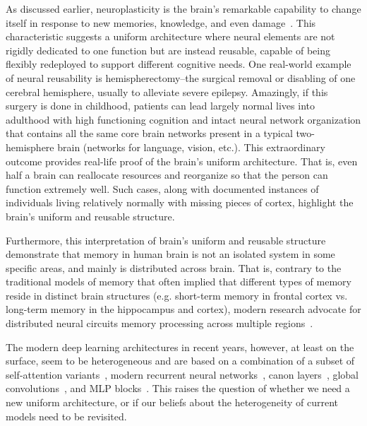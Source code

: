 \documentclass{article}
\newcommand{\citep}{\parencite}
\newcommand{\head}[1]{\vspace{1.7mm}\noindent{{\textcolor{c4}{\bf #1.}}}}
\begin{document}
\head{Brain's Uniform and Reusable Structure} As discussed earlier, neuroplasticity is the brain's remarkable capability to change itself in response to new memories, knowledge, and even damage~\citep{pascual2005plastic, johnston2009plasticity}. This characteristic suggests a uniform architecture where neural elements are not rigidly dedicated to one function but are instead reusable, capable of being flexibly redeployed to support different cognitive needs. One real-world example of neural reusability is hemispherectomy–the surgical removal or disabling of one cerebral hemisphere, usually to alleviate severe epilepsy. Amazingly, if this surgery is done in childhood, patients can lead largely normal lives into adulthood with high functioning cognition and intact neural network organization that contains all the same core brain networks present in a typical two-hemisphere brain (networks for language, vision, etc.). This extraordinary outcome provides real-life proof of the brain’s uniform architecture. That is, even half a brain can reallocate resources and reorganize so that the person can function extremely well. Such cases, along with documented instances of individuals living relatively normally with missing pieces of cortex, highlight the brain's uniform and reusable structure.

Furthermore, this interpretation of brain's uniform and reusable structure demonstrate that memory in human brain is not an isolated system in some specific areas, and mainly is distributed across brain. That is, contrary to the traditional models of memory that often implied that different types of memory reside in distinct brain structures (e.g. short-term memory in frontal cortex vs. long-term memory in the hippocampus and cortex), modern research advocate for distributed neural circuits memory processing across multiple regions~\citep{christophel2017distributed, roy2022brain, kitamura2017engrams}. 

The modern deep learning architectures in recent years, however, at least on the surface, seem to be heterogeneous and are based on a combination of a subset of self-attention variants~\citep{transformers}, modern recurrent neural networks~\citep{katharopoulos2020transformers, schlag2021linear, peng2025rwkv7, behrouz2024titans}, canon layers~\citep{Allenzhu2025-canon}, global convolutions~\citep{poli2023hyena, hasani2023liquid}, and MLP blocks~\citep{shazeer2020glu}. This raises the question of whether we need a new uniform architecture, or if our beliefs about the heterogeneity of current models need to be revisited.
\end{document}
